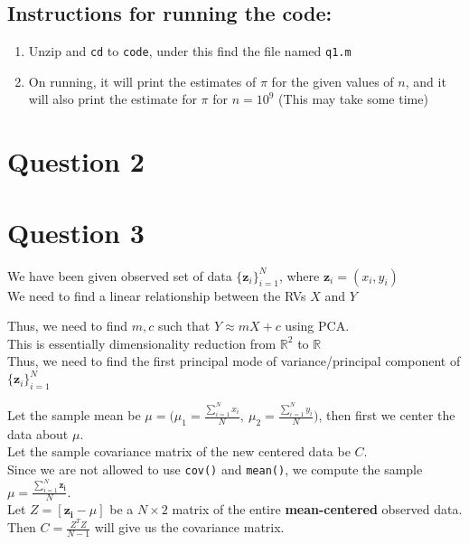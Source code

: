 \documentclass[11pt, fleqn]{article}
\begin{document}
\subsection*{Instructions for running the code:}
\begin{enumerate}[itemsep=-1ex]
    \item Unzip and \texttt{cd} to \texttt{code}, under this find the file named \texttt{q1.m}
    \item On running, it will print the estimates of $\pi$ for the given values of $n$, and it will also print the estimate for $\pi$ for $n = 10^9$ (This may take some time)
\end{enumerate}





\newpage
\section*{Question 2}
\setcounter{equation}{0}
\setcounter{figure}{0}

\newpage
\section*{Question 3}
\setcounter{equation}{0}
\setcounter{figure}{0}
We have been given observed set of data $\{ \mathbf{z}_i \}_{i=1}^{N}$, where $\mathbf{z}_i = (x_i, y_i)$\\
We need to find a linear relationship between the RVs $X$ and $Y$

\medskip
Thus, we need to find $m, c$ such that $Y \approx mX + c$ using PCA.\\
This is essentially dimensionality reduction from $\mathbb{R}^2$ to $\mathbb{R}$\\
Thus, we need to find the first principal mode of variance/principal component of $\{ \mathbf{z}_i \}_{i=1}^{N}$

\medskip
Let the sample mean be $\mu = \bigg(\mu_1 = \frac{\sum_{i=1}^{N}x_i}{N},\  \mu_2 = \frac{\sum_{i=1}^{N}y_i}{N}\bigg)$, then first we center the data about $\mu$.\\
Let the sample covariance matrix of the new centered data be $C$.\\
Since we are not allowed to use \texttt{cov()} and \texttt{mean()}, we compute the sample $\mu = \frac{\sum_{i=1}^{N}\mathbf{z_i}}{N}$.\\
Let $Z = [\mathbf{z_i} - \mu]$ be a $N\times2$ matrix of the entire \textbf{mean-centered} observed data.\\
Then $C = \frac{Z^T Z}{N-1}$ will give us the covariance matrix.
\end{document}
